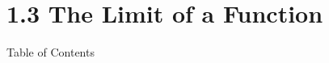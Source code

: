 
\section{1.3 The Limit of a Function}
\begin{frame}{Table of Contents}
\mapofcontentsA{\ac}
 \end{frame}

